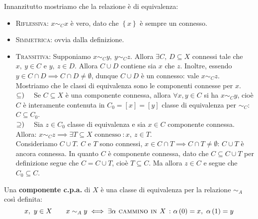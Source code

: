 \begin{demonstration}
Innanzitutto mostriamo che la relazione è di equivalenza:
\begin{itemize}
\item \textsc{Riflessiva}: $x\sim_C x$ è vero, dato che $\left\{x\right\}$ è sempre un connesso.
\item \textsc{Simmetrica}: ovvia dalla definizione.
\item \textsc{Transitiva}: Supponiamo $x\sim_C y,\ y\sim_C z$. Allora $\exists C,\ D\subseteq X$ connessi tale che $x,\ y\in C$ e $y,\ z\in D$. Allora $C\cup D$ contiene sia $x$ che $z$. Inoltre, essendo $y\in C\cap D\implies C\cap D\neq \emptyset$, dunque $C\cup D$ è un connesso: vale $x\sim_C z$.\\
Mostriamo che le classi di equivalenza sono le componenti connesse per $x$.\\
$\subseteq)\quad$ Se $C\subseteq X$ è una componente connessa, allora $\forall x, y\in C$ si ha $x\sim_C y$, cioè $C$ è interamente contenuta in $C_0=[x]=[y]$ classe di equivalenza per $\sim_C$: $C\subseteq C_0$.\\
$\supseteq)\quad$ Sia $z\in C_0$ classe di equivalenza e sia $x\in C$ componente connessa. Allora: $x\sim_C z\implies \exists T\subseteq X \text{ connesso}\ \colon x,\ z\in T$.\\
Consideriamo $C\cup T$. $C$ e $T$ sono connessi, $x\in C\cap T\implies C\cap T\neq \emptyset$: $C\cup T$ è ancora connessa. In quanto $C$ è componente connessa, dato che $C\subseteq C\cup T$ per definizione segue che $C=C\cup T$, cioè $T\subseteq C$. Ma allora $z\in C$ e segue che $C_0\subseteq C$.
\end{itemize}
\end{demonstration}
\begin{define}
Una \textbf{componente c.p.a.} di $X$ è una classe di equivalenza per la relazione $\sim_A$ così definita:
	\begin{equation}
	x,\ y\in X\qquad x\sim_A y\iff \exists \alpha\textsc{ cammino in }X\ \colon \alpha\left(0\right)=x,\ \alpha\left(1\right)=y
\end{equation}
\end{define}

